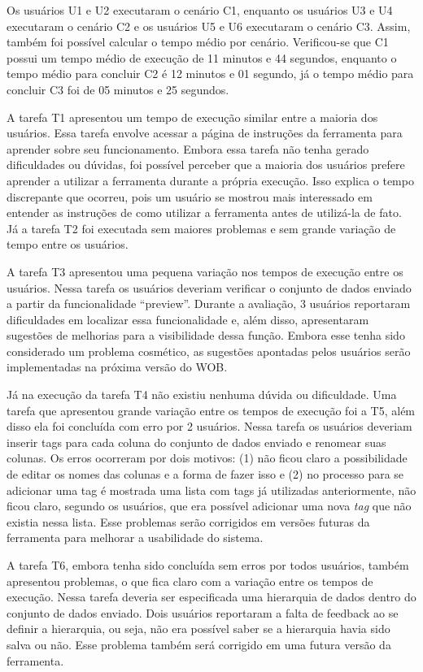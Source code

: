 Os usuários U1 e U2 executaram o cenário C1, enquanto os usuários U3 e U4 executaram o 
cenário C2 e os usuários U5 e U6 executaram o cenário C3. Assim, também foi possível calcular
o tempo médio por cenário. Verificou-se que C1 possui um tempo médio de execução de 11 
minutos e 44 segundos, enquanto o tempo médio para concluir C2 é 12 minutos e 01 segundo, 
já o tempo médio para concluir C3 foi de 05 minutos e 25 segundos.

A tarefa T1 apresentou um tempo de execução similar entre a maioria dos usuários. Essa tarefa 
envolve acessar a página de instruções da ferramenta para aprender sobre seu funcionamento. 
Embora essa tarefa não tenha gerado dificuldades ou dúvidas, foi possível perceber que a 
maioria dos usuários prefere aprender a utilizar a ferramenta durante a própria execução. 
Isso explica o tempo discrepante que ocorreu, pois um usuário se mostrou mais interessado 
em entender as instruções de como utilizar a ferramenta antes de utilizá-la de fato. Já a 
tarefa T2 foi executada sem maiores problemas e sem grande variação de tempo entre os 
usuários.

A tarefa T3 apresentou uma pequena variação nos tempos de execução entre os usuários. 
Nessa tarefa os usuários deveriam verificar o conjunto de dados enviado a partir da 
funcionalidade “preview”. Durante a avaliação, 3 usuários reportaram dificuldades em 
localizar essa funcionalidade e, além disso, apresentaram sugestões de melhorias para 
a visibilidade dessa função. Embora esse tenha sido considerado um problema cosmético, 
as sugestões apontadas pelos usuários serão implementadas na próxima versão do WOB.

Já na execução da tarefa T4 não existiu nenhuma dúvida ou dificuldade. Uma tarefa que 
apresentou grande variação entre os tempos de execução foi a T5, além disso ela foi 
concluída com erro por 2 usuários. Nessa tarefa os usuários deveriam inserir tags para 
cada coluna do conjunto de dados enviado e renomear suas colunas. Os erros ocorreram por 
dois motivos: (1) não ficou claro a possibilidade de editar os nomes das colunas e a 
forma de fazer isso e (2) no processo para se adicionar uma tag é mostrada uma lista com 
tags já utilizadas anteriormente, não ficou claro, segundo os usuários, que era possível 
adicionar uma nova \textit{tag} que não existia nessa lista. Esse problemas serão corrigidos 
em versões futuras da ferramenta para melhorar a usabilidade do sistema.

A tarefa T6, embora tenha sido concluída sem erros por todos usuários, também apresentou 
problemas, o que fica claro com a variação entre os tempos de execução. Nessa tarefa 
deveria ser especificada uma hierarquia de dados dentro do conjunto de dados enviado. 
Dois usuários reportaram a falta de feedback ao se definir a hierarquia, ou seja, não era 
possível saber se a hierarquia havia sido salva ou não. Esse problema também será corrigido 
em uma futura versão da ferramenta.

